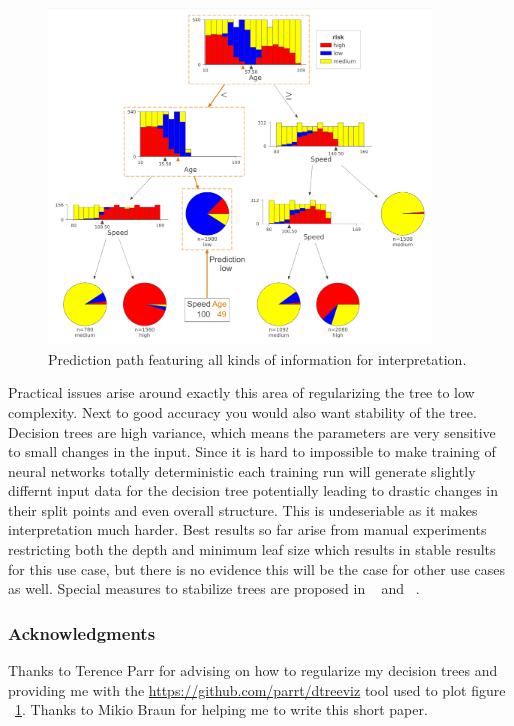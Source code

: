 \documentclass{article} %
\begin{document}
\begin{figure}[h]
\begin{center}
\includegraphics[width=4.0in]{dtreeviz-prediction-path.png}
\end{center}
\caption{Prediction path featuring all kinds of information for interpretation.}
\label{fig:prediction-path}
\end{figure}

Practical issues arise around exactly this area of regularizing the tree to low complexity. Next to good accuracy you would also want stability of the tree. Decision trees are high variance, which means the parameters are very sensitive to small changes in the input. Since it is hard to impossible to make training of neural networks totally deterministic each training run will generate slightly differnt input data for the decision tree potentially leading to drastic changes in their split points and even overall structure. This is undeseriable as it makes interpretation much harder. Best results so far arise from manual experiments restricting both the depth and  minimum leaf size which results in stable results for this use case, but there is no evidence this will be the case for other use cases as well. Special measures to stabilize trees are proposed in ~\citep{arsov2019stability} and ~\citep{last2002stability}. 

\subsubsection*{Acknowledgments}
Thanks to Terence Parr for advising on how to regularize my decision trees and providing me with the \url{https://github.com/parrt/dtreeviz} tool used to plot figure ~\ref{fig:prediction-path}. Thanks to Mikio Braun for helping me to write this short paper.



\end{document}
